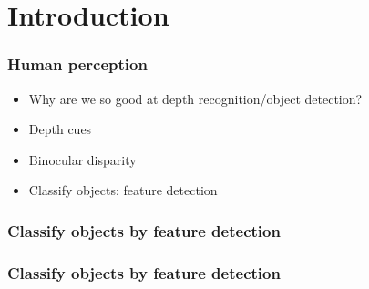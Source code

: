 \documentclass{beamer}
\begin{document}
\section[Outline]{}
\frame{\tableofcontents}

\section{Introduction}
\frame
{
	\frametitle{Human perception}
	\begin{itemize}
	\item <+-| alert@+> Why are we so good at depth recognition/object detection?
	\item <+-| alert@+> Depth cues
	\item <+-| alert@+> Binocular disparity


	\item <+-| alert@+> Classify objects: feature detection
	\end{itemize}
}

\frame
{
	\frametitle{Classify objects by feature detection}
}

\frame
{
	\frametitle{Classify objects by feature detection}
}

\frame
{
}
\end{document}
